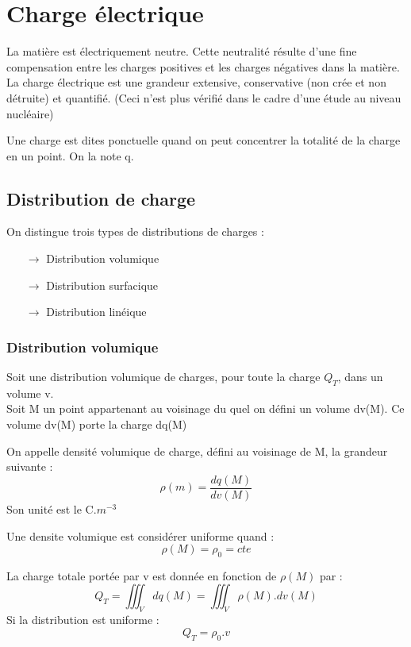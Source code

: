 \chapter{Charge électrique}
\begin{de}
La matière est électriquement neutre. Cette neutralité résulte d'une fine compensation entre les charges positives et les charges négatives dans la matière.\\
La charge électrique est une grandeur extensive, conservative (non crée et non détruite) et quantifié. (Ceci n'est plus vérifié dans le cadre d'une étude au niveau nucléaire)
\end{de}
\begin{de}
Une charge est dites ponctuelle quand on peut concentrer la totalité de la charge en un point. On la note q.
\end{de}
\section{Distribution de charge}
On distingue trois types de distributions de charges :
\begin{itemize}
 \item[$\rightarrow$] Distribution volumique
 \item[$\rightarrow$] Distribution surfacique
 \item[$\rightarrow$] Distribution linéique
\end{itemize}
\subsection{Distribution volumique}
Soit une distribution volumique de charges, pour toute la charge $Q_T$, dans un volume v.\\
Soit M un point appartenant au voisinage du quel on défini un volume dv(M). Ce volume dv(M) porte la charge dq(M)
\begin{de}
On appelle densité volumique de charge, défini au voisinage de M, la grandeur suivante :
$$\rho(m) = \dfrac{dq(M)}{dv(M)}$$
Son unité est le C.$m^{-3}$
\end{de}
\begin{prop}
Une densite volumique est considérer uniforme quand : 
$$\rho(M) = \rho_0 = cte$$
\end{prop}
\begin{prop}
La charge totale portée par v est donnée en fonction de $\rho(M)$ par :
$$Q_T = \iiint_V dq(M) = \iiint_V \rho(M).dv(M)$$
Si la distribution est uniforme : 
$$Q_T = \rho_0.v$$
\end{prop}
